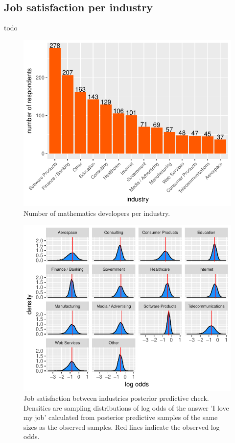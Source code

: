 \documentclass{article}
\begin{document}
\subsection{Job satisfaction per industry}
todo


\begin{figure}[H]
\centering
\includegraphics{report-031}
\caption{Number of mathematics developers per industry.}\label{fig_9}
\end{figure}





\begin{figure}[H]
\centering
\includegraphics{report-036}
\caption{Job satisfaction between industries posterior predictive check. Densities are sampling distributions of log odds of the answer 'I love my job' calculated from posterior predictive samples of the same sizes as the observed samples. Red lines indicate the observed log odds.}\label{fig_10}
\end{figure}
\end{document}
